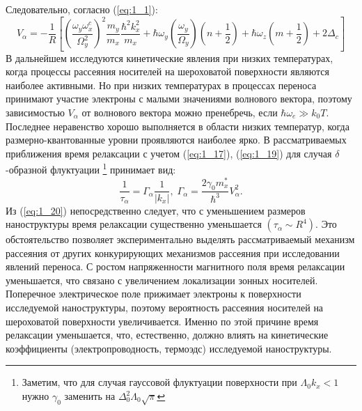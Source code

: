 Следовательно, согласно (\ref{eq:1_1}):
\begin{equation}
\label{eq:1_19}
V_{\alpha }=-\frac{1}{R}\left[{\left(\frac{{\omega }_y{\omega }^c_x}{{\Omega }^2_y}\right)}^2\frac{m_y}{m_x}\frac{{\hbar }^2k^2_x}{m_x}+\hbar {\omega }_y\left(\frac{{\omega }_y}{{\Omega }_y}\right)\left(n+\frac{1}{2}\right)+\hbar {\omega }_z\left(m+\frac{1}{2}\right)+2{\Delta }_c\right]
\end{equation}
В дальнейшем исследуются кинетические явления при низких температурах, когда процессы рассеяния носителей на шероховатой поверхности являются наиболее активными. Но при низких температурах в процессах переноса принимают участие электроны с малыми значениями волнового вектора, поэтому зависимостью $V_\alpha$ от волнового вектора можно пренебречь, если $\hbar\omega_e \gg k_0 T$. Последнее неравенство хорошо выполняется в области низких температур, когда размерно-квантованные уровни проявляются наиболее ярко. В рассматриваемых приближения время релаксации с учетом (\ref{eq:1_17}), (\ref{eq:1_19}) для случая $\delta$-образной флуктуации \footnote{Заметим, что для случая гауссовой флуктуации поверхности при $\Lambda_0 k_x<1$ нужно $\gamma_0$ заменить на $\Delta_0^2 \Lambda_0 \sqrt{\pi}$} принимает вид:
\begin{equation}
\label{eq:1_20}
\frac{1}{{\tau }_{\alpha }}={\Gamma }_{\alpha }\frac{1}{\left|k_x\right|},\;
\Gamma_{\alpha }=\frac{2\gamma_0 m^*_x}{\hbar^3} V^2_{\alpha}.
\end{equation}
Из (\ref{eq:1_20}) непосредственно следует, что с уменьшением размеров наноструктуры время релаксации существенно уменьшается $\left(\tau_\alpha \sim R^4 \right)$. Это обстоятельство позволяет экспериментально выделять рассматриваемый механизм рассеяния \cite{Sakaki1987} от других конкурирующих механизмов рассеяния при исследовании явлений переноса. С ростом напряженности магнитного поля время релаксации уменьшается, что связано с увеличением локализации зонных носителей. Поперечное электрическое поле прижимает электроны к поверхности исследуемой наноструктуры, поэтому вероятность рассеяния носителей на шероховатой поверхности увеличивается. Именно по этой причине время релаксации уменьшается, что, естественно, должно влиять на кинетические коэффициенты (электропроводность, термоэдс) исследуемой наноструктуры.

